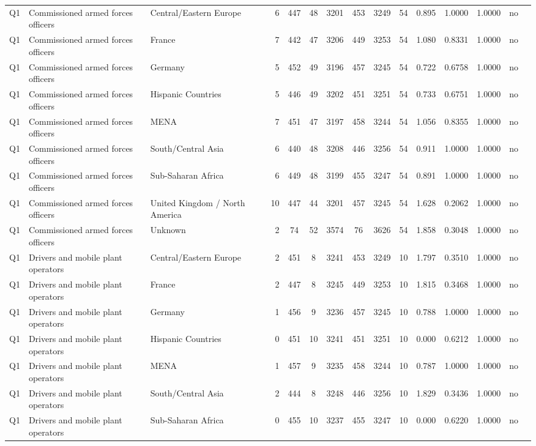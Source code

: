 \begin{longtable}{lllrcccccccccll}
Q1 & Commissioned armed forces officers & Central/Eastern Europe & 6 & 447 & 48 & 3201 & 453 & 3249 & 54 & 0.895 & 1.0000 & 1.0000 & no \\
Q1 & Commissioned armed forces officers & France & 7 & 442 & 47 & 3206 & 449 & 3253 & 54 & 1.080 & 0.8331 & 1.0000 & no \\
Q1 & Commissioned armed forces officers & Germany & 5 & 452 & 49 & 3196 & 457 & 3245 & 54 & 0.722 & 0.6758 & 1.0000 & no \\
Q1 & Commissioned armed forces officers & Hispanic Countries & 5 & 446 & 49 & 3202 & 451 & 3251 & 54 & 0.733 & 0.6751 & 1.0000 & no \\
Q1 & Commissioned armed forces officers & MENA & 7 & 451 & 47 & 3197 & 458 & 3244 & 54 & 1.056 & 0.8355 & 1.0000 & no \\
Q1 & Commissioned armed forces officers & South/Central Asia & 6 & 440 & 48 & 3208 & 446 & 3256 & 54 & 0.911 & 1.0000 & 1.0000 & no \\
Q1 & Commissioned armed forces officers & Sub-Saharan Africa & 6 & 449 & 48 & 3199 & 455 & 3247 & 54 & 0.891 & 1.0000 & 1.0000 & no \\
Q1 & Commissioned armed forces officers & United Kingdom / North America & 10 & 447 & 44 & 3201 & 457 & 3245 & 54 & 1.628 & 0.2062 & 1.0000 & no \\
Q1 & Commissioned armed forces officers & Unknown & 2 & 74 & 52 & 3574 & 76 & 3626 & 54 & 1.858 & 0.3048 & 1.0000 & no \\
Q1 & Drivers and mobile plant operators & Central/Eastern Europe & 2 & 451 & 8 & 3241 & 453 & 3249 & 10 & 1.797 & 0.3510 & 1.0000 & no \\
Q1 & Drivers and mobile plant operators & France & 2 & 447 & 8 & 3245 & 449 & 3253 & 10 & 1.815 & 0.3468 & 1.0000 & no \\
Q1 & Drivers and mobile plant operators & Germany & 1 & 456 & 9 & 3236 & 457 & 3245 & 10 & 0.788 & 1.0000 & 1.0000 & no \\
Q1 & Drivers and mobile plant operators & Hispanic Countries & 0 & 451 & 10 & 3241 & 451 & 3251 & 10 & 0.000 & 0.6212 & 1.0000 & no \\
Q1 & Drivers and mobile plant operators & MENA & 1 & 457 & 9 & 3235 & 458 & 3244 & 10 & 0.787 & 1.0000 & 1.0000 & no \\
Q1 & Drivers and mobile plant operators & South/Central Asia & 2 & 444 & 8 & 3248 & 446 & 3256 & 10 & 1.829 & 0.3436 & 1.0000 & no \\
Q1 & Drivers and mobile plant operators & Sub-Saharan Africa & 0 & 455 & 10 & 3237 & 455 & 3247 & 10 & 0.000 & 0.6220 & 1.0000 & no \\

\end{longtable}
